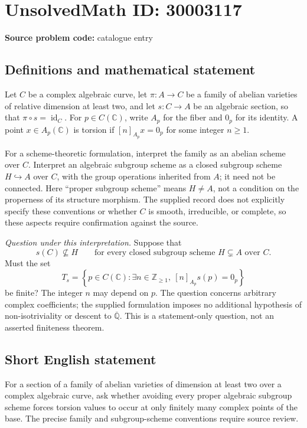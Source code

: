 \documentclass[11pt]{article}
\newcommand{\Z}{\mathbb{Z}}
\newcommand{\Q}{\mathbb{Q}}
\newcommand{\C}{\mathbb{C}}
\begin{document}
\section*{UnsolvedMath ID: 30003117}
\textbf{Source problem code:} catalogue entry
\subsection{Definitions and mathematical statement}
Let \(C\) be a complex algebraic curve, let \(\pi:A\to C\) be a family of abelian varieties of relative dimension at least two, and let \(s:C\to A\) be an algebraic section, so that \(\pi\circ s=\operatorname{id}_C\). For \(p\in C(\C)\), write \(A_p\) for the fiber and \(0_p\) for its identity. A point \(x\in A_p(\C)\) is torsion if \([n]_{A_p}x=0_p\) for some integer \(n\geq1\).

For a scheme-theoretic formulation, interpret the family as an abelian scheme over \(C\). Interpret an algebraic subgroup scheme as a closed subgroup scheme \(H\hookrightarrow A\) over \(C\), with the group operations inherited from \(A\); it need not be connected. Here ``proper subgroup scheme'' means \(H\neq A\), not a condition on the properness of its structure morphism. The supplied record does not explicitly specify these conventions or whether \(C\) is smooth, irreducible, or complete, so these aspects require confirmation against the source.

\emph{Question under this interpretation.} Suppose that
\[
 s(C)\not\subseteq H
 \qquad\text{for every closed subgroup scheme }H\subsetneq A\text{ over }C.
\]
Must the set
\[
 T_s=\left\{p\in C(\C):\exists n\in\Z_{\geq1},\ [n]_{A_p}s(p)=0_p\right\}
\]
be finite? The integer \(n\) may depend on \(p\). The question concerns arbitrary complex coefficients; the supplied formulation imposes no additional hypothesis of non-isotriviality or descent to \(\overline{\Q}\). This is a statement-only question, not an asserted finiteness theorem.
\subsection{Short English statement}
For a section of a family of abelian varieties of dimension at least two over a complex algebraic curve, ask whether avoiding every proper algebraic subgroup scheme forces torsion values to occur at only finitely many complex points of the base. The precise family and subgroup-scheme conventions require source review.
\end{document}
